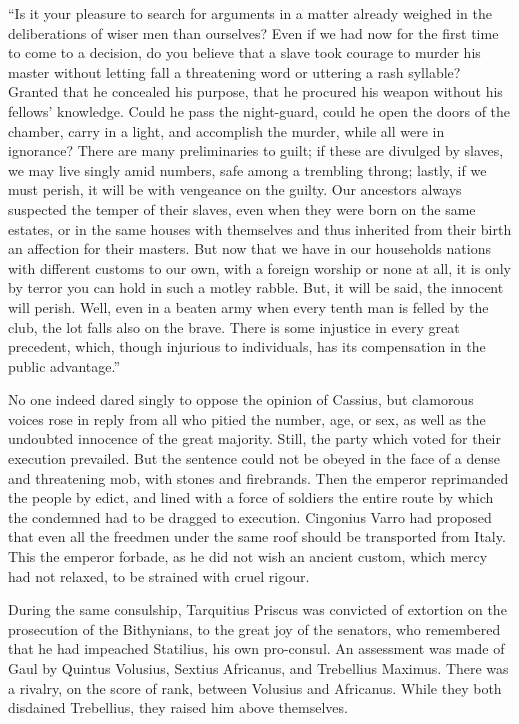 ``Is it your pleasure to search for arguments in a matter already weighed in the deliberations of wiser men than ourselves? Even if we had now for the first time to come to a decision, do you believe that a slave took courage to murder his master without letting fall a threatening word or uttering a rash syllable? Granted that he concealed his purpose, that he procured his weapon without his fellows' knowledge. Could he pass the night-guard, could he open the doors of the chamber, carry in a light, and accomplish the murder, while all were in ignorance? There are many preliminaries to guilt; if these are divulged by slaves, we may live singly amid numbers, safe among a trembling throng; lastly, if we must perish, it will be with vengeance on the guilty. Our ancestors always suspected the temper of their slaves, even when they were born on the same estates, or in the same houses with themselves and thus inherited from their birth an affection for their masters. But now that we have in our households nations with different customs to our own, with a foreign worship or none at all, it is only by terror you can hold in such a motley rabble. But, it will be said, the innocent will perish. Well, even in a beaten army when every tenth man is felled by the club, the lot falls also on the brave. There is some injustice in every great precedent, which, though injurious to individuals, has its compensation in the public advantage.''


No one indeed dared singly to oppose the opinion of Cassius, but clamorous voices rose in reply from all who pitied the number, age, or sex, as well as the undoubted innocence of the great majority. Still, the party which voted for their execution prevailed. But the sentence could not be obeyed in the face of a dense and threatening mob, with stones and firebrands. Then the emperor reprimanded the people by edict, and lined with a force of soldiers the entire route by which the condemned had to be dragged to execution. Cingonius Varro had proposed that even all the freedmen under the same roof should be transported from Italy. This the emperor forbade, as he did not wish an ancient custom, which mercy had not relaxed, to be strained with cruel rigour.


During the same consulship, Tarquitius Priscus was convicted of extortion on the prosecution of the Bithynians, to the great joy of the senators, who remembered that he had impeached Statilius, his own pro-consul. An assessment was made of Gaul by Quintus Volusius, Sextius Africanus, and Trebellius Maximus. There was a rivalry, on the score of rank, between Volusius and Africanus. While they both disdained Trebellius, they raised him above themselves.

